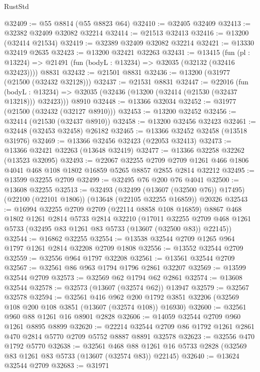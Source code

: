 \begin{lexlean}{RustStd}
\begin{coremodule}
@32409 := @55 @8814 (@55 @8823 @64)
@32410 := @32405 @32409
@32413 := @32382 @32409 @32082 @32214
@32414 := @21513 @32413
@32416 := @13200 (@32414 @21534)
@32419 := @32389 @32409 @32082 @32214
@32421 := @13330 @32419 @2635
@32423 := @13200 @32421 @32263
@32431 := @13415
    (fun (pl : @13224) => @21491 (fun (bodyL : @13234) => @32035 (@32132 (@32416 @32423))))
    @8831
@32432 := @21501 @8831
@32436 := @13200 (@31977 (@21500 (@32432 @32128)))
@32437 := @21531 @8831
@32447 := @22016
    (fun (bodyL : @13234) => @32035 (@32436 (@13200 (@32414 (@21530 (@32437 @13218))) @32423)))
    @8910
@32448 := @13366 @32034
@32452 := @31977 (@21500 (@32432 (@32127 @8910)))
@32453 := @13200 @32452
@32456 := @32414 (@21530 (@32437 @8910))
@32458 := @13200 @32456 @32423
@32461 := @32448 (@32453 @32458) @26182
@32465 := @13366 @32452 @32458 (@13518 @31976)
@32469 := @13366 @32456 @32423 (@22053 @32413)
@32473 := @13366 @32421 @32263 (@13648 @32419)
@32477 := @13366 @32258 @32262 (@13523 @32095)
@32493 := @22067
    @32255
    @2709
    @2709
    @1261
    @466
    @1806
    @4041
    @468
    @108
    @1802
    @16859
    @5265
    @8857
    @2855
    @2814
    @32212
@32495 := @13599 @32255 @2709
@32499 := @32495 @76 @200 @76 @4041
@32500 := @13608 @32255
@32513 := @32493
    (@32499 (@13607 (@32500 @76)) @17495)
    (@22100 (@22101 @1806))
    (@13648 (@22105 @32255 @16859))
    @20326
@32543 := @16994
    @32255
    @2709
    @2709
    (@22114 @8858 @108 @16859)
    @8867
    @468
    @1802
    @1261
    @2814
    @5733
    @2814
    @32210
    (@17011 @32255 @2709 @468 @1261 @5733 (@32495 @83 @1261 @83 @5733 (@13607 (@32500 @83)) @22145))
@32544 := @16862 @32255
@32554 := @13538 @32544 @2709 @1265 @964 @1797 @1261 @2814 @32208 @2709 @1808
@32556 := @13552 @32544 @2709
@32559 := @32556 @964 @1797 @32208
@32561 := @13561 @32544 @2709
@32567 := @32561 @86 @963 @1794 @1796 @2861 @32207
@32569 := @13599 @32544 @2709
@32573 := @32569 @62 @1794 @62 @2861
@32574 := @13608 @32544
@32578 := @32573 (@13607 (@32574 @62)) @13947
@32579 := @32567 @32578
@32594 := @32561
    @416
    @962
    @200
    @1792
    @3851
    @32206
    (@32569 @108 @200 @108 @3851 (@13607 (@32574 @108)) @16930)
@32600 := @32561 @960 @88 @1261 @16 @8901 @2828
@32606 := @14059 @32544 @2709 @960 @1261 @8895 @8899
@32620 := @22214 @32544 @2709 @86 @1792 @1261 @2861 @470 @2814 @5770 @2709 @5752 @8887 @8891 @32578
@32623 := @32556 @470 @1792 @5770
@32638 := @32561
    @468
    @88
    @1261
    @16
    @5733
    @2828
    (@32569 @83 @1261 @83 @5733 (@13607 (@32574 @83)) @22145)
@32640 := @13624 @32544 @2709
@32683 := @31971

\end{coremodule}
\end{lexlean}
